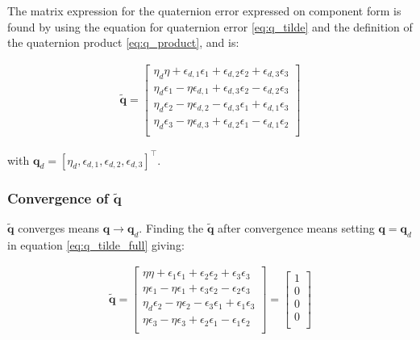 The matrix expression for the quaternion error expressed on component form is found by using the equation for quaternion error  \eqref{eq:q_tilde} and the definition of the quaternion product \eqref{eq:q_product}, and is:



\begin{equation}
    \begin{aligned}
    \tilde{\boldsymbol{q}}
    =
    \begin{bmatrix}
    \eta_d \eta + \epsilon_{d,1} \epsilon_1 + \epsilon_{d,2} \epsilon_2 + \epsilon_{d,3} \epsilon_3 \\
    \eta_d \epsilon_1 - \eta \epsilon_{d,1} + \epsilon_{d,3} \epsilon_{2} - \epsilon_{d,2} \epsilon_{3} \\
    \eta_d \epsilon_2 - \eta \epsilon_{d,2} - \epsilon_{d,3} \epsilon_{1} + \epsilon_{d,1} \epsilon_{3} \\
    \eta_d \epsilon_3 - \eta \epsilon_{d,3} + \epsilon_{d,2} \epsilon_{1} - \epsilon_{d,1} \epsilon_{2} \\
    \end{bmatrix}
    \label{eq:q_tilde_full}
    \end{aligned}
\end{equation}

with $\mathbf{q}_d = [\eta_d, \epsilon_{d,1}, \epsilon_{d,2}, \epsilon_{d,3}]^\top$.

\subsubsection*{ Convergence of $\tilde{\mathbf{q}}$}

$\tilde{\mathbf{q}}$ converges means $\mathbf{q} \rightarrow \mathbf{q}_d$. Finding the $\tilde{\mathbf{q}}$ after convergence means setting $\mathbf{q} = \mathbf{q}_d$  in equation \eqref{eq:q_tilde_full} giving:

\begin{equation}
    \begin{aligned}
    \tilde{\boldsymbol{q}}
    =
    \begin{bmatrix}
    \eta \eta + \epsilon_{1} \epsilon_1 + \epsilon_{2} \epsilon_2 + \epsilon_{3} \epsilon_3 \\
    \eta \epsilon_1 - \eta \epsilon_{1} + \epsilon_{3} \epsilon_{2} - \epsilon_{2} \epsilon_{3} \\
    \eta_d \epsilon_2 - \eta \epsilon_{2} - \epsilon_{3} \epsilon_{1} + \epsilon_{1} \epsilon_{3} \\
    \eta \epsilon_3 - \eta \epsilon_{3} + \epsilon_{2} \epsilon_{1} - \epsilon_{1} \epsilon_{2} \\
    \end{bmatrix}
    = 
    \begin{bmatrix}
    1 \\
    0\\
    0 \\
    0 \\
    \end{bmatrix}
    \label{eq:q_con}
    \end{aligned}
\end{equation}

